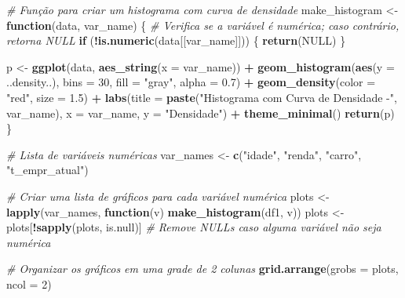 \documentclass[
]{article}
\newenvironment{Shaded}{\begin{snugshade}}{\end{snugshade}}
\newcommand{\AttributeTok}[1]{\textcolor[rgb]{0.13,0.29,0.53}{#1}}
\newcommand{\CommentTok}[1]{\textcolor[rgb]{0.56,0.35,0.01}{\textit{#1}}}
\newcommand{\ConstantTok}[1]{\textcolor[rgb]{0.56,0.35,0.01}{#1}}
\newcommand{\ControlFlowTok}[1]{\textcolor[rgb]{0.13,0.29,0.53}{\textbf{#1}}}
\newcommand{\DecValTok}[1]{\textcolor[rgb]{0.00,0.00,0.81}{#1}}
\newcommand{\FloatTok}[1]{\textcolor[rgb]{0.00,0.00,0.81}{#1}}
\newcommand{\FunctionTok}[1]{\textcolor[rgb]{0.13,0.29,0.53}{\textbf{#1}}}
\newcommand{\NormalTok}[1]{#1}
\newcommand{\OtherTok}[1]{\textcolor[rgb]{0.56,0.35,0.01}{#1}}
\newcommand{\SpecialCharTok}[1]{\textcolor[rgb]{0.81,0.36,0.00}{\textbf{#1}}}
\newcommand{\StringTok}[1]{\textcolor[rgb]{0.31,0.60,0.02}{#1}}
\begin{document}
\begin{Shaded}
\begin{Highlighting}[]
\CommentTok{\# Função para criar um histograma com curva de densidade}
\NormalTok{make\_histogram }\OtherTok{\textless{}{-}} \ControlFlowTok{function}\NormalTok{(data, var\_name) \{}
  \CommentTok{\# Verifica se a variável é numérica; caso contrário, retorna NULL}
  \ControlFlowTok{if}\NormalTok{ (}\SpecialCharTok{!}\FunctionTok{is.numeric}\NormalTok{(data[[var\_name]])) \{}
    \FunctionTok{return}\NormalTok{(}\ConstantTok{NULL}\NormalTok{)}
\NormalTok{  \}}
  
\NormalTok{  p }\OtherTok{\textless{}{-}} \FunctionTok{ggplot}\NormalTok{(data, }\FunctionTok{aes\_string}\NormalTok{(}\AttributeTok{x =}\NormalTok{ var\_name)) }\SpecialCharTok{+}
    \FunctionTok{geom\_histogram}\NormalTok{(}\FunctionTok{aes}\NormalTok{(}\AttributeTok{y =}\NormalTok{ ..density..), }\AttributeTok{bins =} \DecValTok{30}\NormalTok{, }\AttributeTok{fill =} \StringTok{"gray"}\NormalTok{, }\AttributeTok{alpha =} \FloatTok{0.7}\NormalTok{) }\SpecialCharTok{+}
    \FunctionTok{geom\_density}\NormalTok{(}\AttributeTok{color =} \StringTok{"red"}\NormalTok{, }\AttributeTok{size =} \FloatTok{1.5}\NormalTok{) }\SpecialCharTok{+}
    \FunctionTok{labs}\NormalTok{(}\AttributeTok{title =} \FunctionTok{paste}\NormalTok{(}\StringTok{"Histograma com Curva de Densidade {-}"}\NormalTok{, var\_name),}
         \AttributeTok{x =}\NormalTok{ var\_name,}
         \AttributeTok{y =} \StringTok{"Densidade"}\NormalTok{) }\SpecialCharTok{+}
    \FunctionTok{theme\_minimal}\NormalTok{()}
  \FunctionTok{return}\NormalTok{(p)}
\NormalTok{\}}

\CommentTok{\# Lista de variáveis numéricas}
\NormalTok{var\_names }\OtherTok{\textless{}{-}} \FunctionTok{c}\NormalTok{(}\StringTok{"idade"}\NormalTok{, }\StringTok{"renda"}\NormalTok{, }\StringTok{"carro"}\NormalTok{, }\StringTok{"t\_empr\_atual"}\NormalTok{)  }

\CommentTok{\# Criar uma lista de gráficos para cada variável numérica}
\NormalTok{plots }\OtherTok{\textless{}{-}} \FunctionTok{lapply}\NormalTok{(var\_names, }\ControlFlowTok{function}\NormalTok{(v) }\FunctionTok{make\_histogram}\NormalTok{(df1, v))}
\NormalTok{plots }\OtherTok{\textless{}{-}}\NormalTok{ plots[}\SpecialCharTok{!}\FunctionTok{sapply}\NormalTok{(plots, is.null)]  }\CommentTok{\# Remove NULLs caso alguma variável não seja numérica}

\CommentTok{\# Organizar os gráficos em uma grade de 2 colunas}
\FunctionTok{grid.arrange}\NormalTok{(}\AttributeTok{grobs =}\NormalTok{ plots, }\AttributeTok{ncol =} \DecValTok{2}\NormalTok{)}
\end{Highlighting}
\end{Shaded}
\end{document}
